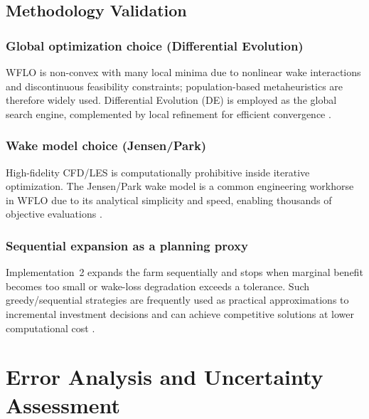 \documentclass[lettersize,journal]{IEEEtran}
\begin{document}

\subsection{Methodology Validation}
\label{subsec:methodology_validation}

\subsubsection{Global optimization choice (Differential Evolution)}
WFLO is non-convex with many local minima due to nonlinear wake interactions and discontinuous feasibility constraints; population-based metaheuristics are therefore widely used. Differential Evolution (DE) is employed as the global search engine, complemented by local refinement for efficient convergence \cite{herbertacero2014review}.

\subsubsection{Wake model choice (Jensen/Park)}
High-fidelity CFD/LES is computationally prohibitive inside iterative optimization. The Jensen/Park wake model is a common engineering workhorse in WFLO due to its analytical simplicity and speed, enabling thousands of objective evaluations \cite{shakoor2016jensenreview,katic1987jensen}.

\subsubsection{Sequential expansion as a planning proxy}
Implementation~2 expands the farm sequentially and stops when marginal benefit becomes too small or wake-loss degradation exceeds a tolerance. Such greedy/sequential strategies are frequently used as practical approximations to incremental investment decisions and can achieve competitive solutions at lower computational cost \cite{chen2016greedy}.


\section{Error Analysis and Uncertainty Assessment}
\label{sec:error_analysis}
\end{document}
